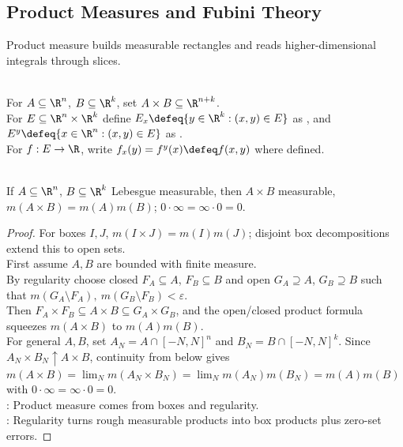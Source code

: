 \subsection{Product Measures and Fubini Theory}

%

Product measure builds measurable rectangles and reads higher-dimensional integrals through slices.

\begin{definition} \label{def:lebesgue-product-slices} \\
For $A\subseteq\R^n$, $B\subseteq\R^k$, set $A\times B\subseteq\R^{n+k}$.\\
For $E\subseteq\R^n\times\R^k$ define $E_x\defeq\{y\in\R^k:(x,y)\in E\}$ as , and  $E^y\defeq\{x\in\R^n:(x,y)\in E\}$ as .\\
For $f:E\to\R$, write $f_x(y)=f^y(x)\defeq f(x,y)$ where defined.
\end{definition}

\begin{theorem} \label{thm:measurable-products-product-measure} \\
If $A\subseteq\R^n$, $B\subseteq\R^k$ Lebesgue measurable, then $A\times B$ measurable, $m(A\times B)=m(A)m(B)$; $0\cdot\infty=\infty\cdot0=0$.
\begin{proof}
For boxes $I,J$, $m(I\times J)=m(I)m(J)$; disjoint box decompositions extend this to open sets.\\
First assume $A,B$ are bounded with finite measure.\\
By regularity choose closed $F_A\subseteq A$, $F_B\subseteq B$ and open $G_A\supseteq A$, $G_B\supseteq B$ such that $m(G_A\setminus F_A),\ m(G_B\setminus F_B)<\varepsilon$.\\
Then $F_A\times F_B\subseteq A\times B\subseteq G_A\times G_B$, and the open/closed product formula squeezes $m(A\times B)$ to $m(A)m(B)$.\\
For general $A,B$, set $A_N=A\cap[-N,N]^n$ and $B_N=B\cap[-N,N]^k$. Since $A_N\times B_N\uparrow A\times B$, continuity from below gives $m(A\times B)=\lim_N m(A_N\times B_N)=\lim_N m(A_N)m(B_N)=m(A)m(B)$ with $0\cdot\infty=\infty\cdot0=0$.\\
: Product measure comes from boxes and regularity.\\
: Regularity turns rough measurable products into box products plus zero-set errors.
\end{proof}
\end{theorem}

